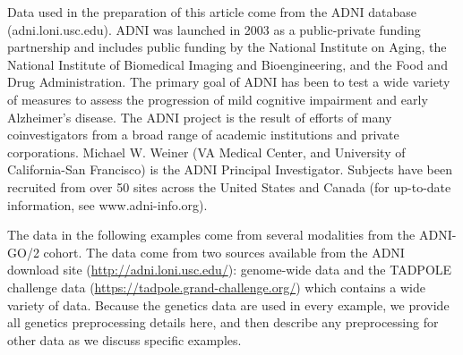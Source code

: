 \documentclass[12pt]{article}
\begin{document}
Data used in the preparation of this article come from the ADNI database
(adni.loni.usc.edu). ADNI was launched in 2003 as a public-private
funding partnership and includes public funding by the National
Institute on Aging, the National Institute of Biomedical Imaging and
Bioengineering, and the Food and Drug Administration. The primary goal
of ADNI has been to test a wide variety of measures to assess the
progression of mild cognitive impairment and early Alzheimer's disease.
The ADNI project is the result of efforts of many coinvestigators from a
broad range of academic institutions and private corporations. Michael
W. Weiner (VA Medical Center, and University of California-San
Francisco) is the ADNI Principal Investigator. Subjects have been
recruited from over 50 sites across the United States and Canada (for
up-to-date information, see www.adni-info.org).

The data in the following examples come from several modalities from the
ADNI-GO/2 cohort. The data come from two sources available from the ADNI
download site (\url{http://adni.loni.usc.edu/}): genome-wide data and
the TADPOLE challenge data (\url{https://tadpole.grand-challenge.org/})
which contains a wide variety of data. Because the genetics data are
used in every example, we provide all genetics preprocessing details
here, and then describe any preprocessing for other data as we discuss
specific examples.
\end{document}
